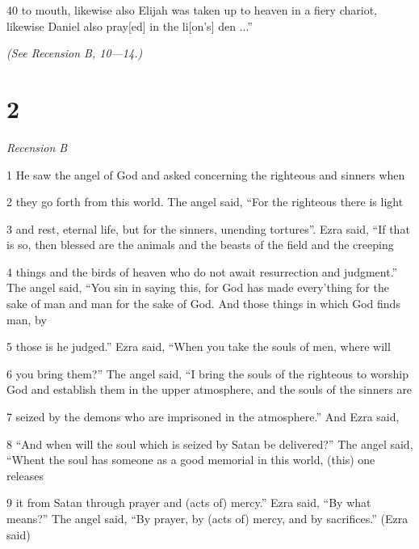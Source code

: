 \par 40 to mouth, likewise also Elijah was taken up to heaven in a fiery chariot, likewise Daniel also pray[ed] in the li[on's] den ...”

\par \textit{(See Recension B, 10—14.)}

\chapter{2}

\par \textit{Recension B}

\par 1 He saw the angel of God and asked concerning the righteous and sinners when

\par 2 they go forth from this world. The angel said, “For the righteous there is light

\par 3 and rest, eternal life, but for the sinners, unending tortures”. Ezra said, “If that is so, then blessed are the animals and the beasts of the field and the creeping

\par 4 things and the birds of heaven who do not await resurrection and judgment.” The angel said, “You sin in saying this, for God has made every'thing for the sake of man and man for the sake of God. And those things in which God finds man, by

\par 5 those is he judged.” Ezra said, “When you take the souls of men, where will

\par 6 you bring them?” The angel said, “I bring the souls of the righteous to worship God and establish them in the upper atmosphere, and the souls of the sinners are

\par 7 seized by the demons who are imprisoned in the atmosphere.” And Ezra said,

\par 8 “And when will the soul which is seized by Satan be delivered?” The angel said, “Whent the soul has someone as a good memorial in this world, (this) one releases

\par 9 it from Satan through prayer and (acts of) mercy.” Ezra said, “By what means?” The angel said, “By prayer, by (acts of) mercy, and by sacrifices.” (Ezra said)

